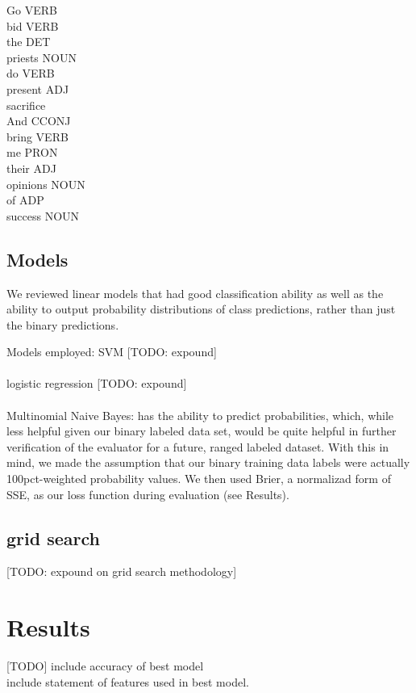 \documentclass[letterpaper, 10 pt, conference]{ieeeconf}  %
\begin{document}
Go VERB  \\  
bid VERB  \\ 
the DET   \\
priests NOUN \\
do  VERB   \\
present ADJ  \\
sacrifice\\
And CCONJ \\
bring VERB  \\
me  PRON   \\
their ADJ    \\
opinions  NOUN  \\
of  ADP    \\
success NOUN \\


\subsection{Models}
We reviewed linear models that had good classification ability as well as the ability to output probability distributions of class predictions, rather than just the binary predictions.


Models employed:
SVM [TODO: expound]\\ \\
logistic regression [TODO: expound]\\ \\
Multinomial Naive Bayes:
  has the ability to predict probabilities, which, while less helpful given our binary labeled data set, would be quite helpful in further verification of the evaluator for a future, ranged labeled dataset. With this in mind, we made the assumption that our binary training data labels were actually 100pct-weighted probability values. We then used Brier, a normalizad form of SSE, as our loss function during evaluation (see Results).


  \subsection{grid search}
    [TODO: expound on grid search methodology]

  \section{Results}
    [TODO]
    include accuracy of best model\\
    include statement of features used in best model.\\
\end{document}
